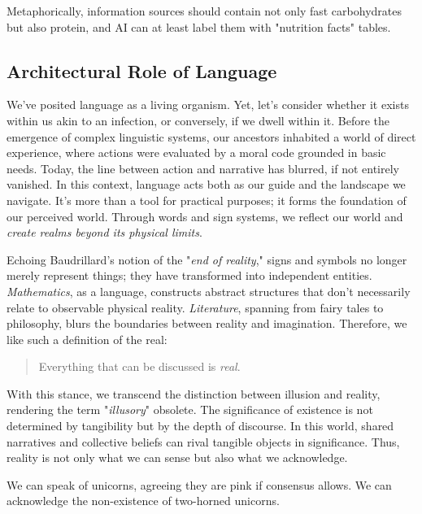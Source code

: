 \documentclass[11pt,a4]{article}
\begin{document}
    Metaphorically, information sources should contain not only
    fast carbohydrates but also protein, and AI can at least
    label them with "nutrition facts" tables.





    \subsection{Architectural Role of Language}
    We've posited language as a living organism. Yet, let's consider whether
    it exists within us akin to an infection, or conversely, if we dwell within it.
    Before the emergence of complex linguistic systems, our ancestors inhabited
    a world of direct experience, where actions were evaluated by a moral code
    grounded in basic needs. Today, the line between action and narrative has
    blurred, if not entirely vanished. In this context, language acts both
    as our guide and the landscape we navigate. It's more than a tool
    for practical purposes; it forms the foundation of our perceived
    world. Through words and sign systems, we reflect our
    world and \textit{create realms beyond its physical limits}.

    Echoing Baudrillard's notion of the "\textit{end of reality}," signs
    and symbols no longer merely represent things; they have
    transformed into independent entities.
    \textit{Mathematics}, as a language, constructs abstract structures
    that don't necessarily relate to observable physical
    reality. \textit{Literature}, spanning from fairy
    tales to philosophy, blurs the boundaries between reality
    and imagination. Therefore, we like such a definition of the real:

        \begin{quote}
            Everything that can be discussed is \textit{real}.
        \end{quote}

    With this stance, we transcend the distinction between illusion and reality,
    rendering the term "\textit{illusory}" obsolete. The significance of
    existence is not determined by tangibility but by the depth of discourse.
    In this world, shared narratives and collective beliefs can rival
    tangible objects in significance. Thus, reality is not only what we
    can sense but also what we acknowledge.

    We can speak of unicorns, agreeing they are pink if consensus allows.
    We can acknowledge the non-existence of two-horned unicorns.
\end{document}
